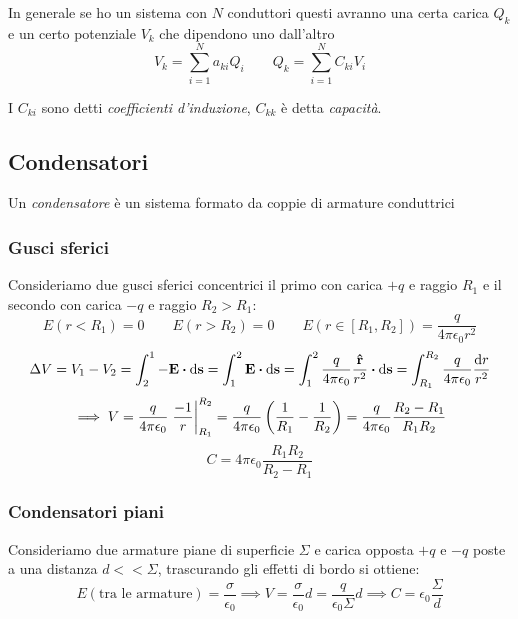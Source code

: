 \documentclass[12pt,a4paper]{article}
\begin{document}
In generale se ho un sistema con $N$ conduttori questi avranno una certa carica $Q_k$ e un certo potenziale $V_k$ che dipendono uno dall'altro
\begin{equation*}
    V_k = \sum_{i=1}^{N} a_{ki}Q_i \quad \quad Q_k = \sum_{i=1}^{N} C_{ki}V_i
\end{equation*}

I $C_{ki}$ sono detti \textit{coefficienti d'induzione}, $C_{kk}$ è detta \textit{capacità}.

\subsection{Condensatori}
\begin{definition}
    Un \textit{condensatore} è un sistema formato da coppie di armature conduttrici
\end{definition}

\subsubsection{Gusci sferici}
Consideriamo due gusci sferici concentrici il primo con carica $+q$ e raggio $R_1$ e il secondo con carica $-q$ e raggio $R_2 > R_1$:
\begin{equation*}
    E(r<R_1)=0\qquad E(r>R_2)=0\qquad E(r \in [R_1,R_2])= \frac{q}{4\pi\epsilon_0r^2}
\end{equation*}
\begin{equation*}
    \Delta V = V_1-V_2= \int_{2}^{1}-\vb{E}\vdot\dd{\vb{s}}= \int_{1}^{2}\vb{E}\vdot\dd{\vb{s}}= 
    \int_{1}^{2}\frac{q}{4\pi\epsilon_0}\frac{\vu{r}}{r^2}\vdot\dd{\vb{s}} = \int_{R_1}^{R_2}\frac{q}{4\pi\epsilon_0}\frac{\dd{r}}{r^2}
\end{equation*}
\begin{equation*}
    \implies V = \frac{q}{4\pi\epsilon_0}\eval{\frac{-1}{r}}_{R_1}^{R_2}= \frac{q}{4\pi\epsilon_0}\left( \frac{1}{R_1}-\frac{1}{R_2} \right)
    = \frac{q}{4\pi\epsilon_0}\frac{R_2-R_1}{R_1R_2}
\end{equation*}
\begin{equation*}
    C = 4\pi\epsilon_0\frac{R_1R_2}{R_2-R_1}
\end{equation*}

\subsubsection{Condensatori piani}
Consideriamo due armature piane di superficie $\Sigma$ e carica opposta $+q$ e $-q$ poste a una distanza $d<<\Sigma$, trascurando gli effetti di bordo si ottiene:
\begin{equation*}
    E(\text{tra le armature})= \frac{\sigma}{\epsilon_0}\implies V = \frac{\sigma}{\epsilon_0}d = \frac{q}{\epsilon_0\Sigma}d 
    \implies C = \epsilon_0\frac{\Sigma}{d}
\end{equation*}
\end{document}
